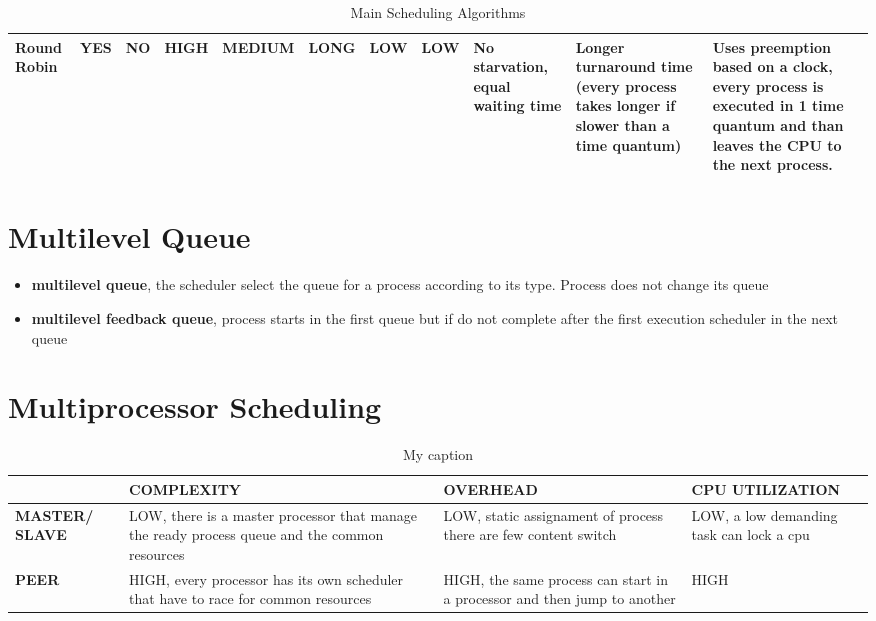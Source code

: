 \begin{table}[]
{\begin{tabular}{|m{}|m{}|m{}|m{}|m{}|m{}|m{}|m{}|m{}|m{}|m{}|}
			Round Robin                          & YES                 & NO                & HIGH                     & MEDIUM             & LONG                                                 & LOW                                             & LOW                                             & No starvation, equal waiting time                                                                                                      & Longer turnaround time (every process takes longer if slower than a time quantum)                       & Uses preemption based on a clock, every process is executed in 1 time quantum and than leaves the CPU to the next process. \\ \hline
		\end{tabular}%
	}
	\caption{Main Scheduling Algorithms}
	\label{Tab:Algorithms}
\end{table}


\section{Multilevel Queue}
\begin{itemize}
	\item{\textbf{multilevel queue}}, the scheduler select the queue for a process according to its type. Process does not change its queue
	\item{\textbf{multilevel feedback queue}}, process starts in the first queue but if do not complete after the first execution scheduler in the next queue
\end{itemize}

\section{Multiprocessor Scheduling}
\begin{table}[]
	\centering
	\caption{My caption}
	\label{my-label}
	\begin{tabular}{|m{}|m{}|m{}|m{}|}
		\hline
		& \textbf{COMPLEXITY} & \textbf{OVERHEAD} & CPU UTILIZATION \\ \hline
		\textbf{MASTER/ SLAVE} & LOW, there is a master processor that manage the ready process queue and the common resources & LOW, static assignament of process there are few content switch & LOW, a low demanding task can lock a cpu \\ \hline
		\textbf{PEER} & HIGH, every processor has its own scheduler that have to race for common resources & HIGH, the same process can start in a processor and then jump to another & HIGH \\ \hline
	\end{tabular}
\end{table}


